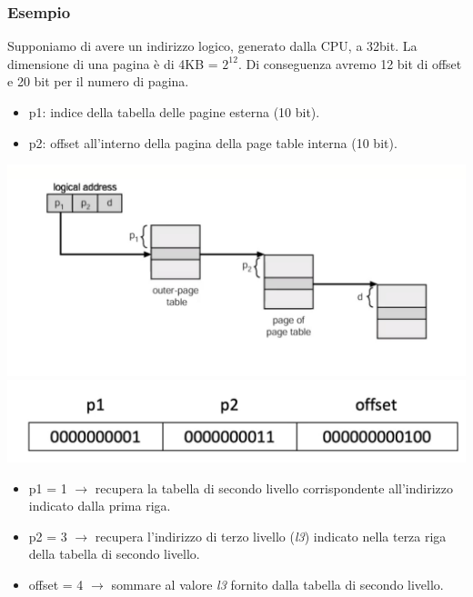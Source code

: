 \documentclass[a4paper,12pt, twoside]{report}
\begin{document}
\subsubsection{Esempio}
Supponiamo di avere un indirizzo logico, generato dalla CPU, a 32bit. La dimensione di una pagina \`e di 
4KB = $2^{12}$. Di conseguenza avremo 12 bit di offset e 20 bit per il numero di pagina. 
\begin{itemize}
    \item p1: indice della tabella delle pagine esterna (10 bit).
    \item p2: offset all'interno della pagina della page table interna (10 bit). 
\end{itemize} 
\begin{center}
    \includegraphics[scale=0.2]{multipag_example}
    \includegraphics[scale=0.2]{index_example}
\end{center}
\begin{itemize}
    \item p1 = 1 $\to$ recupera la tabella di secondo livello corrispondente all'indirizzo indicato dalla 
        prima riga. 
    \item p2 = 3 $\to$ recupera l'indirizzo di terzo livello (\emph{l3}) indicato nella terza riga della tabella di 
        secondo livello. 
    \item offset = 4 $\to$ sommare al valore \emph{l3} fornito dalla tabella di secondo livello.
\end{itemize}
\end{document}
